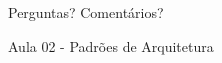 \documentclass[
	10pt, %
	t, %
]{beamer}
\begin{document}
	





	






\begin{frame}[plain] %
	\begin{center}
		\bigskip\bigskip %
		
		{\Huge Perguntas? Comentários?}
		
		\bigskip\bigskip %
		
		{\LARGE Aula 02 - Padrões de Arquitetura}
	\end{center}
\end{frame}

\end{document}
